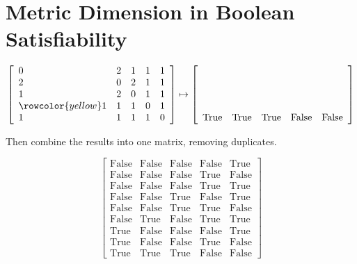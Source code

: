 \documentclass[12pt]{article}
\def\hlr{\rowcolor{yellow}}
\def\True{\mathrm{True}}
\def\False{\mathrm{False}}
\begin{document}
\newpage
\section*{Metric Dimension in Boolean Satisfiability}

\[
\left[ \begin{array}{lllll}
	     0 & 2 & 1 & 1 & 1 \\
	     2 & 0 & 2 & 1 & 1 \\
	     1 & 2 & 0 & 1 & 1 \\
	\hlr 1 & 1 & 1 & 0 & 1 \\
	     1 & 1 & 1 & 1 & 0
\end{array} \right]
\mapsto
\left[ \begin{array}{ccccc}
	\\
	\\
	\\
	\\
	 \True &  \True &  \True & \False & \False
\end{array} \right]
\]

Then combine the results into one matrix, removing duplicates.

\begin{minipage}[m]{0.55\textwidth}
\setlength{\parskip}{\baselineskip}

\[
\left[ \begin{array}{ccccc}
	\False & \False & \False & \False &  \True \\
	\False & \False & \False &  \True & \False \\
	\False & \False & \False &  \True &  \True \\
	\False & \False &  \True & \False &  \True \\
	\False & \False &  \True &  \True & \False \\
	\False &  \True & \False &  \True &  \True \\
	 \True & \False & \False & \False &  \True \\
	 \True & \False & \False &  \True & \False \\
	 \True &  \True &  \True & \False & \False
\end{array} \right]
\]

\end{minipage}
\hfill
\begin{minipage}[m]{0.4\textwidth}
	\begin{figure}[H]
		
	\end{figure}
\end{minipage}
\end{document}
